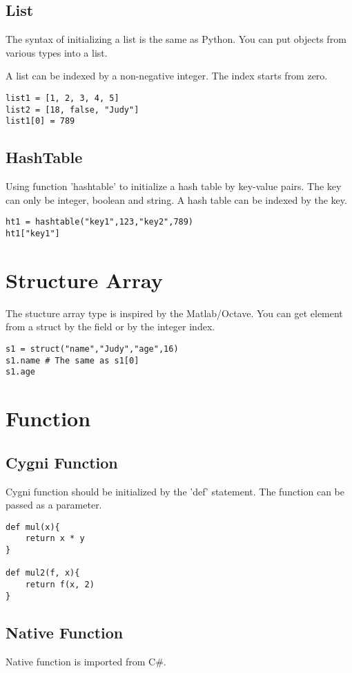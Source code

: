 \subsection{List}
The syntax of initializing a list is the same as Python. You can put objects from various types into a list.

A list can be indexed by a non-negative integer. The index starts from zero.
\begin{lstlisting}
list1 = [1, 2, 3, 4, 5]
list2 = [18, false, "Judy"]
list1[0] = 789
\end{lstlisting}

\subsection{HashTable}
Using function 'hashtable' to initialize a hash table by key-value pairs. The key can only be integer, boolean and string.
A hash table can be indexed by the key.
\begin{lstlisting}
ht1 = hashtable("key1",123,"key2",789)
ht1["key1"]
\end{lstlisting}

\section{Structure Array}
The stucture array type is inspired by the Matlab/Octave. You can get element from a struct by the field or by the integer index.
\begin{lstlisting}
s1 = struct("name","Judy","age",16)
s1.name # The same as s1[0]
s1.age
\end{lstlisting}

\section{Function}
\subsection{Cygni Function}
Cygni function should be initialized by the 'def' statement. The function can be passed as a parameter. 
\begin{lstlisting}
def mul(x){
	return x * y
}

def mul2(f, x){
	return f(x, 2)
}
\end{lstlisting}

\subsection{Native Function}
Native function is imported from C\#.

